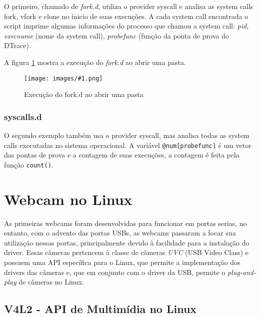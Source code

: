 \documentclass[a4paper]{scrartcl}
\newcommand{\code}[1]{}
\newcommand{\Fig}[2]{
\begin{figure}
        \centering
        \texttt{[image: images/\#1.png]}
        \caption{#2}
        \label{fig:#1}
\end{figure}}
\begin{document}
O primeiro, chamado de \emph{fork.d}, utiliza o provider syscall e analisa as system calls fork, vfork e clone no ínicio de suas execuções. A cada system call encontrada o script imprime algumas informações do processo que chamou a system call: \emph{pid}, \emph{execname} (nome da system call), \emph{probefunc} (função da ponta de prova do DTrace).

A figura \ref{fig:fase03_ss1} mostra a execução do \emph{fork.d} ao abrir uma pasta.

\Fig{fase03_ss1}{Execução do fork.d ao abrir uma pasta}

\code{fork.d}

\subsubsection{syscalls.d}

O segundo exemplo também usa o provider syscall, mas analisa todas as system calls executadas no sistema operacional. A variável {\tt @num[probefunc]} é um vetor das pontas de prova e a contagem de suas execuções, a contagem é feita pela função {\tt count()}.

\code{syscalls.d}

\section{Webcam no Linux}

As primeiras webcams foram desenvolvidas para funcionar em portas serias, no entanto, com o advento das portas USBs, as webcams passaram a focar sua utilização nessas portas, principalmente devido à facilidade para a instalação do driver. Essas câmeras pertencem à classe de câmeras \emph{UVC} (USB Video Class) e possuem uma API específica para o Linux, que permite a implementação dos drivers das câmeras e, que em conjunto com o driver da USB, permite o \emph{plug-and-play} de câmeras no Linux.

\subsection{V4L2 - API de Multimídia no Linux}\label{sec:v4l2}
\end{document}
